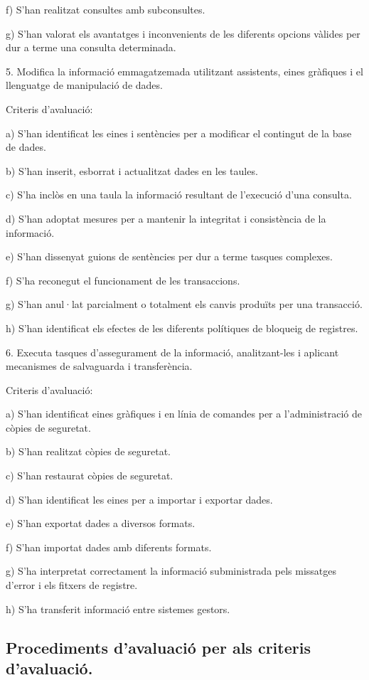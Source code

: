 \documentclass[catalan, a4paper, 12pt, titlepage]{article}
\begin{document}
f) S'han realitzat consultes amb subconsultes.

g) S'han valorat els avantatges i inconvenients de les diferents opcions vàlides per dur a terme una consulta determinada.

5. Modifica la informació emmagatzemada utilitzant assistents, eines gràfiques i el llenguatge de manipulació de dades.

Criteris d'avaluació:

a) S'han identificat les eines i sentències per a modificar el contingut de la base de dades.

b) S'han inserit, esborrat i actualitzat dades en les taules.

c) S'ha inclòs en una taula la informació resultant de l'execució d'una consulta.

d) S'han adoptat mesures per a mantenir la integritat i consistència de la informació.

e) S'han dissenyat guions de sentències per dur a terme tasques complexes.

f) S'ha reconegut el funcionament de les transaccions.

g) S'han anul·lat parcialment o totalment els canvis produïts per una transacció.

h) S'han identificat els efectes de les diferents polítiques de bloqueig de registres.

6. Executa tasques d'assegurament de la informació, analitzant-les i aplicant mecanismes de salvaguarda i transferència.

Criteris d'avaluació:

a) S'han identificat eines gràfiques i en línia de comandes per a l'administració de còpies de seguretat.

b) S'han realitzat còpies de seguretat.

c) S'han restaurat còpies de seguretat.

d) S'han identificat les eines per a importar i exportar dades.

e) S'han exportat dades a diversos formats.

f) S'han importat dades amb diferents formats.

g) S'ha interpretat correctament la informació subministrada pels missatges d'error i els fitxers de registre.

h) S'ha transferit informació entre sistemes gestors.

\subsection{Procediments d'avaluació per als criteris d'avaluació.}
\label{subsec:procediments}
\end{document}
